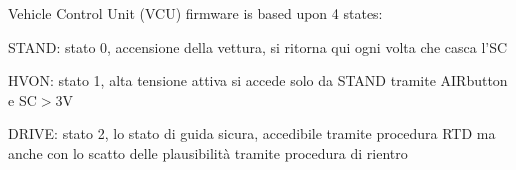 Vehicle Control Unit (V\-C\-U) firmware is based upon 4 states\-:
\begin{DoxyItemize}
\item S\-T\-A\-N\-D\-: stato 0, accensione della vettura, si ritorna qui ogni volta che casca l'S\-C
\item H\-V\-O\-N\-: stato 1, alta tensione attiva si accede solo da S\-T\-A\-N\-D tramite A\-I\-Rbutton e S\-C$>$3\-V
\item D\-R\-I\-V\-E\-: stato 2, lo stato di guida sicura, accedibile tramite procedura R\-T\-D ma anche con lo scatto delle plausibilità tramite procedura di rientro 
\end{DoxyItemize}